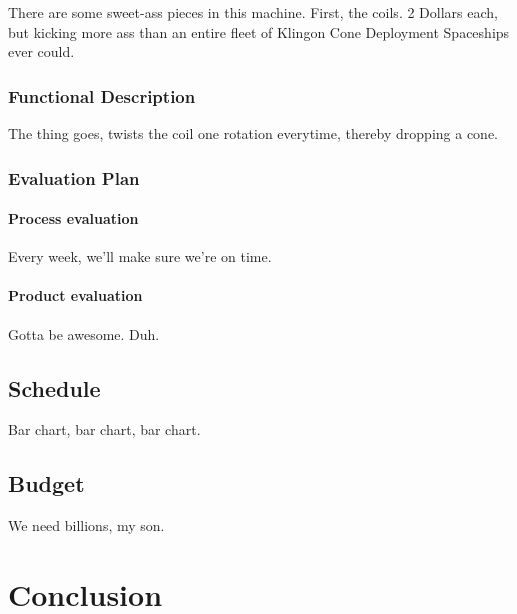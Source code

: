 \documentclass[11pt]{report}
\begin{document}
There are some sweet-ass pieces in this machine. First, the coils. 2 Dollars each, but kicking more ass than an entire fleet of Klingon Cone Deployment Spaceships ever could.

\subsection{Functional Description}

The thing goes, twists the coil one rotation everytime, thereby dropping a cone.

\subsection{Evaluation Plan}
\subsubsection{Process evaluation}
Every week, we'll make sure we're on time.
\subsubsection{Product evaluation}
Gotta be awesome. Duh.

\section{Schedule}
Bar chart, bar chart, bar chart.

\section{Budget}
We need billions, my son.

\chapter{Conclusion}


%
\end{document}
